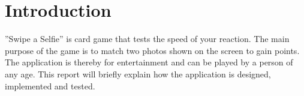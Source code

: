 \section{Introduction}
''Swipe a Selfie'' is card game that tests the speed of your reaction. The main purpose of the game is to match two photos shown on the screen to gain points. The application is thereby for entertainment and can be played by a person of any age. This report will briefly explain how the application is designed, implemented and tested.
